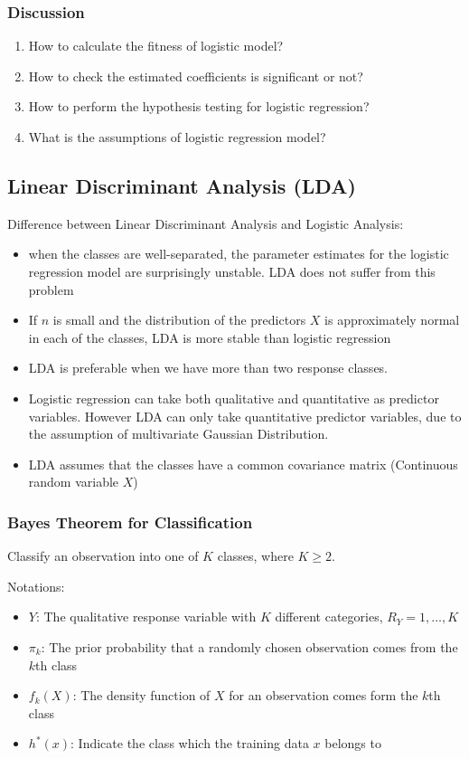 \documentclass[12pt,a4paper]{article}%
\theoremstyle{definition}
\theoremstyle{plain}
\numberwithin{equation}{section}
\begin{document}
\subsubsection{Discussion}
\begin{enumerate}
\item How to calculate the fitness of logistic model?
\item How to check the estimated coefficients is significant or not?
\item How to perform the hypothesis testing for logistic regression? 
\item What is the assumptions of logistic regression model?
\end{enumerate}

\subsection{\textbf{Linear Discriminant Analysis (LDA)}}

Difference between Linear Discriminant Analysis and Logistic Analysis:
\begin{itemize}
\item when the classes are well-separated, the parameter estimates for the logistic regression model are surprisingly unstable. LDA does not suffer from this problem
\item If $n$ is small and the distribution of the predictors $X$ is approximately normal in each of the classes, LDA is more stable than logistic regression
\item LDA is preferable when we have more than two response classes.
\item Logistic regression can take both qualitative and quantitative as predictor variables. However LDA can only take quantitative predictor variables, due to the assumption of multivariate Gaussian Distribution.
\item LDA assumes that the classes have a common covariance matrix
(Continuous random variable $X$)
\end{itemize}

\subsubsection{\textbf{Bayes Theorem for Classification}}
Classify an observation into one of $K$ classes, where $K \geq 2$.

Notations: 
\begin{itemize}
\item $Y$: The qualitative response variable with $K$ different categories, $R_{Y} = {1,\dots,K}$
\item $\pi_{k}$: The prior probability that a randomly chosen observation comes from the $k$th class
\item $f_{k}(X)$: The density function of $X$ for an observation comes form the $k$th class
\item $h^{*}(x)$: Indicate the class which the training data $x$ belongs to
\end{itemize}
\end{document}
